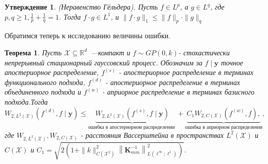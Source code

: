 \documentclass[12pt, twoside]{article}
\newcommand{\yb}{{\mathbf{y}}}
\newtheorem{theorem}{Теорема}
\newtheorem{corollary}{Утверждение}
\begin{document}
\begin{corollary}
(Неравенство Гёльдера). Пусть $ f \in L^{p} $, а $g \in L^{q}$, где $p, q \geq 1,\frac{1}{p} + \frac{1}{q}=1$. Тогда $f \cdot g \in L^{1}$, и $\|f \cdot g\|_{1} \leq\|f\|_{p} \cdot\|g\|_{q}$
\end{corollary}


Обратимся теперь к исследованию величины ошибки.
\begin{theorem}
Пусть $\mathcal{X} \subseteq \mathbb{R}^d$~---компакт и $f\sim GP(0,k)$- стохастически непрерывный стационарный гауссовский процесс. 
Обозначим за $f \mid \yb$ точное апостериорное распределение, $f^{(s)}$ - апостериорное распределение в терминах функционального подхода, $f^{(d)}$ - апостериорное распределение в терминах объединенного подхода и $f^{(w)}$ - априорное распределение в терминах базисного подхода.Тогда
\begin{equation}
    W_{2, L^{2}(\mathcal{X})}\left(f^{(d)}, f \mid \boldsymbol{y}\right) \leq \underbrace{W_{2, L^{2}(\mathcal{X})}\left(f^{(s)}, f \mid \boldsymbol{y}\right)}_{\text {ошибка в апостериорном распределении }}+\underbrace{C_{1} W_{2, C(\mathcal{X})}\left(f^{(w)}, f\right),}_{\text {ошибка в априорном распределении}},
\end{equation}
где $W_{2, L^{2}(\mathcal{X})}, W_{2, C(\mathcal{X})}$ - расстояния Вассерштейна в пространствах $L^{2}(\mathcal{X})$ и $C(\mathcal{X})$ и $C_1 = \sqrt{2\left(1+\|k\|_{C\left(\mathcal{X}^{2}\right)}^{2}\left\|\mathbf{K}_{m m}^{-1}\right\|_{L\left(\ell^{\infty} ; \ell^{1}\right)}^{2}\right)}$.


\end{theorem}
\end{document}
